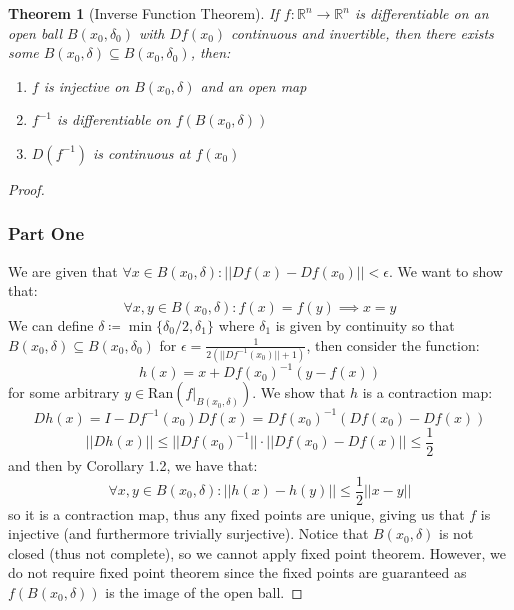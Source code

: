 \documentclass[10pt,letterpaper]{article} %
\newtheorem{thm}{Theorem}[section]
\begin{document}
\begin{thm}[Inverse Function Theorem]
If $f: \mathbb{R}^n \xrightarrow{} \mathbb{R}^n$ is differentiable on an open ball $B(x_0, \delta_0)$ with $Df(x_0)$ continuous and invertible, then there exists some $B(x_0, \delta) \subseteq B(x_0, \delta_0)$, then:
\begin{enumerate}
\item $f$ is injective on $B(x_0, \delta)$ and an open map
\item $f^{-1}$ is differentiable on $f(B(x_0, \delta))$
\item $D(f^{-1})$ is continuous at $f(x_0)$
\end{enumerate}
\end{thm}
\begin{proof}
\subsubsection*{Part One}
We are given that $\forall x \in B(x_0, \delta): ||Df(x) - Df(x_0)|| < \epsilon$. We want to show that:
\begin{equation*}
\forall x, y \in B(x_0, \delta): f(x) = f(y) \implies x = y
\end{equation*}
We can define $\delta \coloneq \min\{\delta_0/2, \delta_1\}$ where $\delta_1$ is given by continuity so that $B(x_0, \delta) \subseteq B(x_0, \delta_0)$ for $\epsilon = \frac{1}{2(||Df^{-1}(x_0)|| + 1)}$, then consider the function:
\begin{equation*}
h(x) = x + Df(x_0)^{-1}(y - f(x))
\end{equation*}
for some arbitrary $y \in \text{Ran}(f|_{B(x_0, \delta)})$. We show that $h$ is a contraction map:
\begin{equation*}
Dh(x) = I - Df^{-1}(x_0)Df(x) = Df(x_0)^{-1}(Df(x_0) - Df(x))
\end{equation*}
\begin{equation*}
||Dh(x)|| \leqslant ||Df(x_0)^{-1}|| \cdot ||Df(x_0) - Df(x)|| \leqslant \frac{1}{2}
\end{equation*}
and then by Corollary 1.2, we have that:
\begin{equation*}
\forall x, y \in B(x_0, \delta): ||h(x) - h(y)|| \leqslant \frac{1}{2}||x-y||
\end{equation*}
so it is a contraction map, thus any fixed points are unique, giving us that $f$ is injective (and furthermore trivially surjective). Notice that $B(x_0, \delta)$ is not closed (thus not complete), so we cannot apply fixed point theorem. However, we do not require fixed point theorem since the fixed points are guaranteed as $f(B(x_0, \delta))$ is the image of the open ball.


\end{proof}
\end{document}
